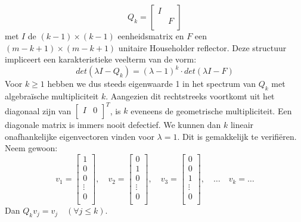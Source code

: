 \documentclass[een]{practicumverslag}
\begin{document}
\begin{equation}
		Q_k = \begin{bmatrix}
		I &  \\
  		  & F   \\
		\end{bmatrix} 
\end{equation}
met $I$ de $(k-1) \times (k-1)$ eenheidsmatrix en $F$ een $(m-k+1) \times (m-k+1)$ unitaire Householder reflector.
Deze structuur impliceert een karakteristieke veelterm van de vorm:
\begin{equation}
		det(\lambda I - Q_k) = (\lambda-1)^k \cdot det(\lambda I-F)
\end{equation}
Voor $k \geq 1$ hebben we dus steeds eigenwaarde 1 in het spectrum van $Q_k$ met algebraïsche multipliciteit $k$. 
Aangezien dit rechtstreeks voortkomt uit het diagonaal zijn van $\begin{bmatrix} I & 0\\ \end{bmatrix}^T$, is $k$ eveneens de geometrische multipliciteit. 
Een diagonale matrix is immers nooit defectief.
We kunnen dan $k$ lineair onafhankelijke eigenvectoren vinden voor $\lambda = 1$.
Dit is gemakkelijk te verifiëren.
Neem gewoon:
\begin{equation}
	v_1 = \begin{bmatrix}
		   1  \\
  		   0  \\
  		   0  \\
  		   \vdots  \\
  		   0  \\
		  \end{bmatrix}, \quad
  	v_2 = \begin{bmatrix}
		   0  \\
  		   1  \\
  		   0  \\
  		   \vdots  \\
  		   0  \\
		  \end{bmatrix}, \quad
	v_3 = \begin{bmatrix}
		   0  \\
  		   0  \\
  		   1  \\
  		   \vdots  \\
  		   0  \\
		  \end{bmatrix}, \quad  \dots \quad
	v_k = \dots
\end{equation}
Dan $Q_k v_j = v_j \quad(\forall j \leq k)$.
\end{document}
